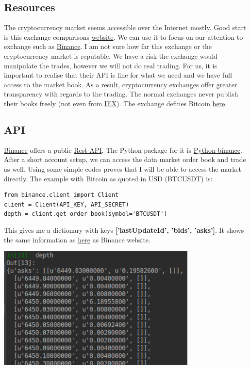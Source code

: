 \documentclass[12pt]{article}
\begin{document}
\subsection{Resources}
The cryptocurrency market seems accessible over the Internet mostly. Good start is this exchange comparisons \href{https://coinmarketcap.com/}{website}. We can use it to focus on our attention to exchange such as \href{https://www.binance.com/en}{Binance}. I am not sure how far this exchange or the cryptocurrency market is reputable. We have a risk the exchange would manipulate the trades, however we will not do real trading. For us, it is important to realise that their API is fine for what we need and we have full access to the market book. As a result, cryptocurrency exchanges offer greater transparency with regards to the trading. The normal exchanges never publish their books freely (not even from \href{https://iextrading.com/}{IEX}). The exchange defines Bitcoin \href{https://info.binance.com/en/currencies/bitcoin}{here}.
\subsection{API}
 \href{https://www.binance.com/en}{Binance} offers a public  \href{https://github.com/binance-exchange/binance-official-api-docs/blob/master/rest-api.md}{Rest API}. The Python package for it is 
  \href{https://python-binance.readthedocs.io/en/latest/}{Python-binance}. After a short account setup, we can access the data market order book and trade as well. Using some simple codes proves that I will be able to access the market directly. The example with Bitcoin as quoted in USD (BTCUSDT) is:
\begin{verbatim}
from binance.client import Client
client = Client(API_KEY, API_SECRET)
depth = client.get_order_book(symbol='BTCUSDT')
\end{verbatim}
This gives me a dictionary with keys \textbf{['lastUpdateId', 'bids', 'asks']}. It shows the same information as \href{https://www.binance.com/en/trade/BTC_USDT}{here} as Binance website.

\begin{center}
\includegraphics[width=10cm]{book.png}
\end{center}
\end{document}

